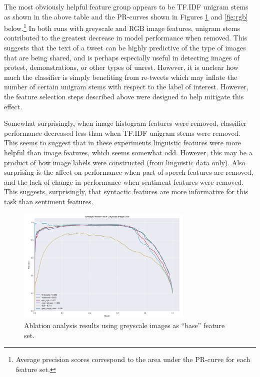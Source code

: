 \documentclass[twoside,11pt]{article}
\begin{document}
The most obviously helpful feature group appears to be TF.IDF unigram stems as shown in the above table and the PR-curves shown in Figures \ref{fig:grey} and \ref{fig:rgb} below.\footnote{Average precision scores correspond to the area under the PR-curve for each feature set.} In both runs with greyscale and RGB image features, unigram stems contributed to the greatest decrease in model performance when removed. This suggests that the text of a tweet can be highly predictive of the type of images that are being shared, and is perhaps especially useful in detecting images of protest, demonstrations, or other types of unrest. However, it is unclear how much the classifier is simply benefiting from re-tweets which may inflate the number of certain unigram stems with respect to the label of interest. However, the feature selection steps described above were designed to help mitigate this effect.
\par
Somewhat surprisingly, when image histogram features were removed, classifier performance decreased less than when TF.IDF unigram stems were removed. This seems to suggest that in these experiments linguistic features were more helpful than image features, which seems somewhat odd. However, this may be a product of how image labels were constructed (from linguistic data only). Also surprising is the affect on performance when part-of-speech features are removed, and the lack of change in performance when sentiment features were removed. This suggests, surprisingly, that syntactic features are more informative for this task than sentiment features.

\begin{figure}[h]
\centering
\includegraphics[width=0.75\textwidth]{greyscale_ablation.png}
\caption{Ablation analysis results using greyscale images as ``base'' feature set.}
\label{fig:grey}
\end{figure}
\end{document}
